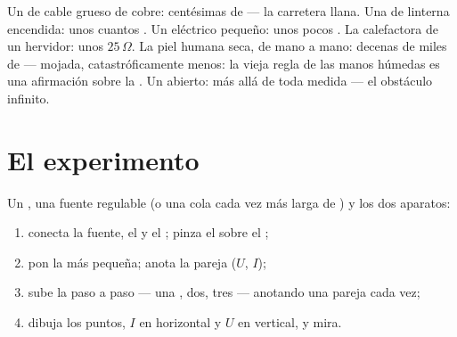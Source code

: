 \begin{example}\label{ex:g8:ohms-law:values}
Un  de cable grueso de cobre: centésimas de
 --- la carretera llana. Una  de linterna
encendida: unos cuantos . Un  eléctrico
pequeño: unos pocos . La  calefactora de un
hervidor: unos $25\,\Omega$. La piel humana seca, de mano a mano:
decenas de miles de  --- mojada, catastróficamente menos: la
vieja regla de las manos húmedas es una afirmación sobre la
. Un  abierto:
 más allá de toda medida --- el obstáculo infinito.
\end{example}

\section{El experimento}

\begin{method}\label{met:g8:ohms-law:portrait}
Un , una fuente regulable (o una cola cada vez más larga de )
y los dos aparatos:
\begin{enumerate}
  \item conecta la fuente, el  y el
         ; pinza el
         sobre el ;
  \item pon la  más pequeña; anota la pareja ($U$,
        $I$);
  \item sube la  paso a paso --- una , dos, tres
        --- anotando una pareja cada vez;
  \item dibuja los puntos, $I$ en horizontal y $U$ en vertical, y
        mira.
\end{enumerate}
\end{method}

